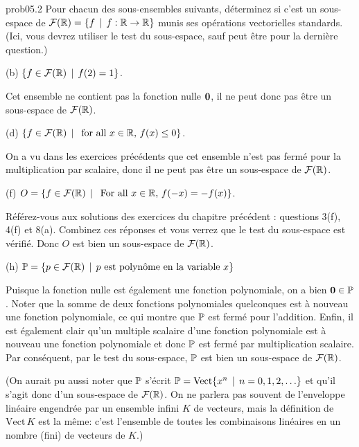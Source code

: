 \bigskip
\begin{sol}{prob05.2}   Pour chacun des sous-ensembles suivants, déterminez si c'est un sous-espace de $\mathcal{F}(\mathbb{R})=\{f \, \mid \, f : \mathbb{R} \to \mathbb{R}\}$ munis ses opérations vectorielles standards. (Ici, vous devrez utiliser le test du sous-espace, sauf peut \^etre pour la derni\`ere question.)  
 
 \medskip


(b) $\{f \in \mathcal{F}(\mathbb{R}) \, \mid \, f(2)=1 \}$. 

\soln Cet ensemble ne contient pas la fonction nulle $\mathbf{0}$, il ne peut donc pas être un sous-espace de $\mathcal{F}(\mathbb{R})$. \medskip
 

(d)   $\{f \in \mathcal{F}(\mathbb{R}) \, \mid \, \text{ for all } x\in \mathbb{R},   \, f(x)\le 0\}$. 

\soln On a vu dans les exercices précédents que cet ensemble n'est pas fermé pour la multiplication par scalaire, donc il ne peut pas être un sous-espace de $\mathcal{F}(\mathbb{R})$.\medskip 

(f)   $O=\{f \in \mathcal{F}(\mathbb{R}) \, \mid \, \text{ For all } x\in \mathbb{R},   \, f(-x)= -f(x)\}$.  

\soln Référez-vous aux solutions des exercices du chapitre précédent : questions 3(f), 4(f) et 8(a). Combinez ces réponses et vous verrez que le test du sous-espace est v\'erifié. Donc $O$ est bien un sous-espace de $\mathcal{F}(\mathbb{R})$.\medskip 





(h) $\mathbb{P}=\{p \in \mathcal{F}(\mathbb{R})   \, \mid \, p \text{ est polyn\^ome en la variable } x\}$

 \soln Puisque la fonction nulle est également une fonction polynomiale, on a bien $\mathbf{0} \in \mathbb{P}$. Noter que la somme de deux fonctions polynomiales quelconques est à nouveau une fonction polynomiale, ce qui montre que $\mathbb{P}$ est fermé pour l'addition. Enfin, il est également clair qu'un multiple scalaire d'une fonction polynomiale est à nouveau une fonction polynomiale et donc $\mathbb{P}$ est fermé par multiplication scalaire. Par conséquent, par le test du sous-espace, $\mathbb{P}$ est bien un sous-espace de $\mathcal{F}(\mathbb{R})$. 

(On aurait pu aussi noter que $\mathbb{P}$ s'écrit $\mathbb{P}=\operatorname{ Vect} \normalsize\{x^n \, \mid \, n=0, 1,2, \dots\normalsize\}$ et qu'il s'agit donc d'un sous-espace de $\mathcal{F}(\mathbb{R})$. On ne parlera pas souvent de l'enveloppe lin\'eaire engendr\'ee par un ensemble infini $K$ de vecteurs, mais la définition de $\text{Vect}\,K$ est la même: c'est l'ensemble de toutes les combinaisons linéaires en un nombre (fini) de vecteurs de $K$.)\medskip 

 


\end{sol}

